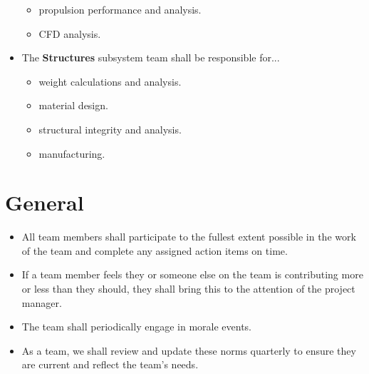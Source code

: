 \begin{itemize}
\begin{itemize}
        \item propulsion performance and analysis.
        \item CFD analysis.
    \end{itemize}
    \item The \textbf{Structures} subsystem team shall be responsible for...
    \begin{itemize}
        \item weight calculations and analysis.
        \item material design.
        \item structural integrity and analysis.
        \item manufacturing.
    \end{itemize}
\end{itemize}

\section{General}

\begin{itemize}
    \item All team members shall participate to the fullest extent possible in the work of the team and complete any assigned action items on time.
    \item If a team member feels they or someone else on the team is contributing more or less than they should, they shall bring this to the attention of the project manager.
    \item The team shall periodically engage in morale events.
    \item As a team, we shall review and update these norms quarterly to ensure they are current and reflect the team's needs.
\end{itemize}
